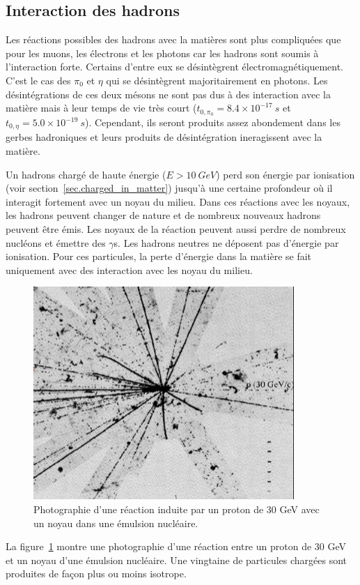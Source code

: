 \subsection{Interaction des hadrons}
Les réactions possibles des hadrons avec la matières sont plus compliquées que pour les muons, les électrons et les photons car les hadrons sont soumis à l'interaction forte. Certains d'entre eux se désintègrent électromagnétiquement. C'est le cas des $\pi_0$ et $\eta$ qui se désintègrent majoritairement en photons. Les désintégrations de ces deux mésons ne sont pas dus à des interaction avec la matière mais à leur temps de vie très court ($t_{0,\pi_0}=8.4\times 10^{-17}\ s$ et $t_{0,\eta}=5.0\times 10^{-19}\ s$). Cependant, ils seront produits assez abondement dans les gerbes hadroniques et leurs produits de désintégration ineragissent avec la matière. 

Un hadrons chargé de haute énergie ($E>10\ GeV$) perd son énergie par ionisation (voir section~\ref{sec.charged_in_matter}) jusqu'à une certaine profondeur où il interagit fortement avec un noyau du milieu. Dans ces réactions avec les noyaux, les hadrons peuvent changer de nature et de nombreux nouveaux hadrons peuvent être émis. Les noyaux de la réaction peuvent aussi perdre de nombreux nucléons et émettre des $\gamma$s. Les hadrons neutres ne déposent pas d'énergie par ionisation. Pour ces particules, la perte d'énergie dans la matière se fait uniquement avec des interaction avec les noyau du milieu. 
\begin{figure}[!h]
  \begin{center}
    \includegraphics[width=.6\textwidth]{ShowerTh/figs/nuclear_reaction_emulsion.png}
    \caption{Photographie d'une réaction induite par un proton de 30 GeV avec un noyau dans une émulsion nucléaire.}
    \label{fig:hadron_nucleus_interaction}
  \end{center}
\end{figure}
La figure~\ref{fig:hadron_nucleus_interaction} montre une photographie d'une réaction entre un proton de 30 GeV et un noyau d'une émulsion nucléaire. Une vingtaine de particules chargées sont produites de façon plus ou moins isotrope. 

